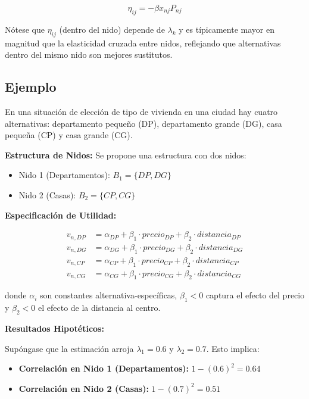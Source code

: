 \documentclass[
]{book}
\providecommand{\tightlist}{%
  \setlength{\itemsep}{0pt}\setlength{\parskip}{0pt}}
\begin{document}
\begin{equation}
\eta_{ij} = -\beta x_{nj} P_{nj}
\label{eq:elastbetween}
\end{equation}

Nótese que \(\eta_{ij}\) (dentro del nido) depende de \(\lambda_k\) y es típicamente mayor en magnitud que la elasticidad cruzada entre nidos, reflejando que alternativas dentro del mismo nido son mejores sustitutos.

\subsection{Ejemplo}\label{ejemplo}

En una situación de elección de tipo de vivienda en una ciudad hay cuatro alternativas: departamento pequeño (DP), departamento grande (DG), casa pequeña (CP) y casa grande (CG).

\textbf{Estructura de Nidos:} Se propone una estructura con dos nidos:

\begin{itemize}
\tightlist
\item
  Nido 1 (Departamentos): \(B_1 = \{DP, DG\}\)
\item
  Nido 2 (Casas): \(B_2 = \{CP, CG\}\)
\end{itemize}

\textbf{Especificación de Utilidad:}

\[
\begin{aligned}
v_{n,DP} &= \alpha_{DP} + \beta_1 \cdot precio_{DP} + \beta_2 \cdot distancia_{DP}\\
v_{n,DG} &= \alpha_{DG} + \beta_1 \cdot precio_{DG} + \beta_2 \cdot distancia_{DG}\\
v_{n,CP} &= \alpha_{CP} + \beta_1 \cdot precio_{CP} + \beta_2 \cdot distancia_{CP}\\
v_{n,CG} &= \alpha_{CG} + \beta_1 \cdot precio_{CG} + \beta_2 \cdot distancia_{CG}
\end{aligned}
\]

donde \(\alpha_i\) son constantes alternativa-específicas, \(\beta_1 < 0\) captura el efecto del precio y \(\beta_2 < 0\) el efecto de la distancia al centro.

\textbf{Resultados Hipotéticos:}

Supóngase que la estimación arroja \(\lambda_1 = 0.6\) y \(\lambda_2 = 0.7\). Esto implica:

\begin{itemize}
\tightlist
\item
  \textbf{Correlación en Nido 1 (Departamentos):} \(1 - (0.6)^2 = 0.64\)
\item
  \textbf{Correlación en Nido 2 (Casas):} \(1 - (0.7)^2 = 0.51\)
\end{itemize}
\end{document}
